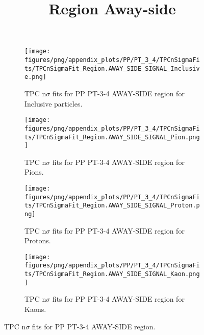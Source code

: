             \begin{figure}[H]
                \title{Region Away-side}
                \begin{subfigure}[b]{0.5\textwidth}
                    \centering
                    \texttt{[image: figures/png/appendix\_plots/PP/PT\_3\_4/TPCnSigmaFits/TPCnSigmaFit\_Region.AWAY\_SIDE\_SIGNAL\_Inclusive.png]}
                    \caption{TPC n$\sigma$ fits for PP PT-3-4 AWAY-SIDE region for Inclusive particles.}
                    \label{fig:appendix_PP_PT-3-4_AWAY_SIDE_SIGNAL_Inclusive}
                \end{subfigure}
                \begin{subfigure}[b]{0.5\textwidth}
                    \centering
                    \texttt{[image: figures/png/appendix\_plots/PP/PT\_3\_4/TPCnSigmaFits/TPCnSigmaFit\_Region.AWAY\_SIDE\_SIGNAL\_Pion.png]}
                    \caption{TPC n$\sigma$ fits for PP PT-3-4 AWAY-SIDE region for Pions.}
                    \label{fig:appendix_PP_PT-3-4_AWAY_SIDE_SIGNAL_Pion}
                \end{subfigure}
                \begin{subfigure}[b]{0.5\textwidth}
                    \centering
                    \texttt{[image: figures/png/appendix\_plots/PP/PT\_3\_4/TPCnSigmaFits/TPCnSigmaFit\_Region.AWAY\_SIDE\_SIGNAL\_Proton.png]}
                    \caption{TPC n$\sigma$ fits for PP PT-3-4 AWAY-SIDE region for Protons.}
                    \label{fig:appendix_PP_PT-3-4_AWAY_SIDE_SIGNAL_Proton}
                \end{subfigure}
                \begin{subfigure}[b]{0.5\textwidth}
                    \centering
                    \texttt{[image: figures/png/appendix\_plots/PP/PT\_3\_4/TPCnSigmaFits/TPCnSigmaFit\_Region.AWAY\_SIDE\_SIGNAL\_Kaon.png]}
                    \caption{TPC n$\sigma$ fits for PP PT-3-4 AWAY-SIDE region for Kaons.}
                    \label{fig:appendix_PP_PT-3-4_AWAY_SIDE_SIGNAL_Kaon}
                \end{subfigure}
                \caption{TPC n$\sigma$ fits for PP PT-3-4 AWAY-SIDE region.}
                \label{fig:appendix_PP_PT-3-4_AWAY_SIDE_SIGNAL}
            \end{figure}
